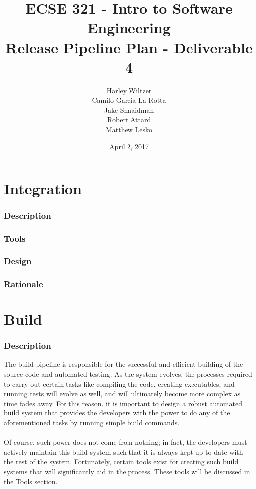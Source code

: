 \documentclass[12pt]{report}
\title{ECSE 321 - Intro to Software Engineering\\Release Pipeline Plan - Deliverable 4}
\author{Harley Wiltzer\\Camilo Garcia La Rotta\\Jake Shnaidman\\Robert Attard\\Matthew Lesko}
\date{April 2, 2017}
\begin{document}
\maketitle
\newpage
{} %
\tableofcontents
\part{Integration}
\section{Description}
\section{Tools}
\section{Design}
\section{Rationale}
\part{Build}
\section{Description}
The build pipeline is responsible for the successful and efficient building of the source code and
automated testing. As the system evolves, the processes required to carry out certain tasks like
compiling the code, creating executables, and running tests will evolve as well, and will ultimately
become more complex as time fades away. For this reason, it is important to design a robust automated
build system that provides the developers with the power to do any of the aforementioned tasks by
running simple build commands.\\\\
Of course, such power does not come from nothing; in fact, the developers must actively maintain
this build system such that it is always kept up to date with the rest of the system. Fortunately,
certain tools exist for creating such build systems that will significantly aid in the process.
These tools will be discussed in the \hyperref[s:build-tools]{Tools} section.
\end{document}
